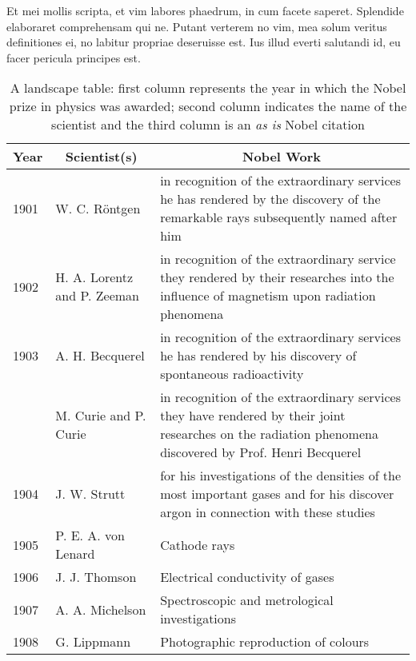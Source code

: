 Et mei mollis scripta, et vim labores phaedrum, in cum facete saperet. 
Splendide elaboraret comprehensam qui ne. Putant verterem no vim, mea solum 
veritus definitiones ei, no labitur propriae deseruisse est. Ius illud everti 
salutandi id, eu facer pericula principes est.

\begin{landscape}
  \begin{table}[hbt]
    \caption{A landscape table: 
      first column represents the year in which the Nobel prize in 
      physics was awarded; second column indicates the name of the 
      scientist and the third column is an \textsl{as is} Nobel
      citation}
    \begin{center}
      \begin{tabular}{p{0.40in}p{2.30in}p{4.85in}}
        \hline
        \multicolumn{1}{c}{\textbf{Year}} &
        \multicolumn{1}{c}{\textbf{Scientist(s)}} &
        \multicolumn{1}{c}{\textbf{Nobel Work}}\\
        \hline
        1901 & W. C. R\"{o}ntgen           & in recognition of the extraordinary services he has rendered by the discovery of the remarkable rays subsequently named after him\\
        1902 & H. A. Lorentz and P. Zeeman & in recognition of the extraordinary service they rendered by their researches into the influence of magnetism upon radiation phenomena\\
        1903 & A. H. Becquerel             & in recognition of the extraordinary services he has rendered by his discovery of spontaneous radioactivity\\
             & M. Curie and P. Curie       & in recognition of the extraordinary services they have rendered by their joint researches on the radiation phenomena discovered by Prof. Henri Becquerel\\
        1904 & J. W. Strutt                & for his investigations of the densities of the most important gases and for his discover argon in connection with these studies\\
        1905 & P. E. A. von Lenard         & Cathode rays\\
        1906 & J. J. Thomson               & Electrical conductivity of gases\\
        1907 & A. A. Michelson             & Spectroscopic and metrological investigations\\
        1908 & G. Lippmann                 & Photographic reproduction of colours\\

\end{tabular}
\end{center}
\end{table}
\end{landscape}
